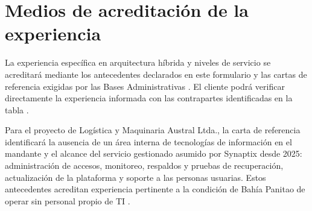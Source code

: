 \documentclass[11pt,letterpaper]{report}
\begin{document}
\section*{Medios de acreditación de la experiencia}
La experiencia específica en arquitectura híbrida y niveles de servicio se acreditará mediante los antecedentes declarados en este formulario y las cartas de referencia exigidas por las Bases Administrativas \parencite[art.~34.1, p.~22]{bases-admin}. El cliente podrá verificar directamente la experiencia informada con las contrapartes identificadas en la tabla \parencite[art.~34.2, p.~22]{bases-admin}.

Para el proyecto de Logística y Maquinaria Austral Ltda., la carta de referencia identificará la ausencia de un área interna de tecnologías de información en el mandante y el alcance del servicio gestionado asumido por Synaptix desde 2025: administración de accesos, monitoreo, respaldos y pruebas de recuperación, actualización de la plataforma y soporte a las personas usuarias. Estos antecedentes acreditan experiencia pertinente a la condición de Bahía Panitao de operar sin personal propio de TI \parencite[sec.~9.11 y cap.~15, certificaciones sectoriales del adjudicatario]{caso07}.

\clearpage
\printbibliography[heading=referenciassynaptix,title={Referencias}]
\end{document}
